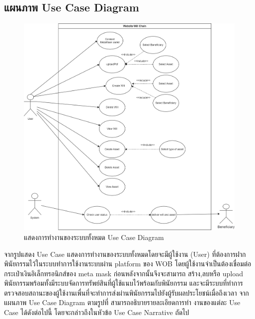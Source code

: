 \documentclass[12pt,oneside,openright,a4paper]{cpe-thai-project}
\begin{document}
\subsection{แผนภาพ Use Case Diagram}
	\begin{figure}[!htb]
		\centering
		\includegraphics[scale=0.2]{UseCaseDiagram}
		\caption{แสดงการทำงานของระบบทั้งหมด Use Case Diagram}
	\end{figure}
\FloatBarrier
\tab จากรูปแสดง Use Case แสดงการทำงานของระบบทั้งหมดโดยจะมีผู้ใช้งาน (User) ที่ต้องการฝากพินัยกรรมไว้ในระบบทำการใช้งานระบบผ่าน platform ของ WOB โดยผู้ใช้งานจำเป็นต้องเชื่อมต่อกระเป๋าเงินอิเล็กทรอนิกส์ของ meta mask ก่อนหลังจากนั้นจึงจะสามารถ สร้าง,ลบหรือ upload พินัยกรรมพร้อมทั้งมีระบบจัดการทรัพย์สินที่ผู้ใช้แนบไว้พร้อมกับพินัยกรรม และจะมีระบบที่ทำการตรวจสอบสถานะของผู้ใช้งานเพื่นที่จะทำการส่งผ่านพินัยกรรมไปยังผู้รับผลประโยชน์เมื่อถึงเวลา   จากแผนภาพ Use Case Diagram ตามรูปที่ สามารถอธิบายรายละเอียดการทํา งานของแต่ละ Use Case ได้ดังต่อไปนี้ โดยจะกล่าวถึงในหัวข้อ Use Case Narrative ถัดไป
\FloatBarrier
\end{document}
